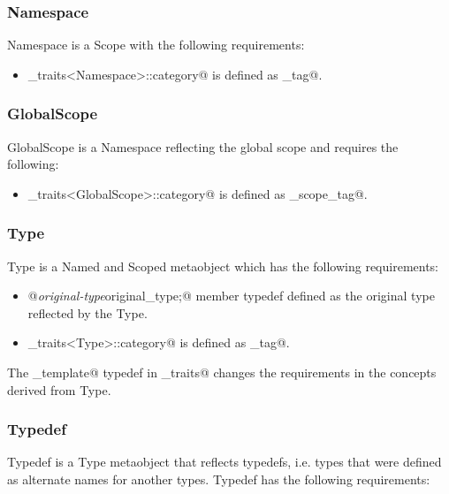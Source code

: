\subsubsection{Namespace}

{\metaobject Namespace} is a {\metaobject Scope} with the following requirements:

\begin{itemize}
	\item \verb@metaobject_traits<Namespace>::category@ is defined as
	\verb@namespace_tag@.
\end{itemize}

\subsubsection{GlobalScope}

{\metaobject GlobalScope} is a {\metaobject Namespace} reflecting the global scope
and requires the following:

\begin{itemize}
	\item \verb@metaobject_traits<GlobalScope>::category@ is defined as
	\verb@global_scope_tag@.
\end{itemize}

\subsubsection{Type}

{\metaobject Type} is a {\metaobject Named} and {\metaobject Scoped} metaobject which
has the following requirements:

\begin{itemize}
	\item{\verb@typedef @{\em original-type}\verb@ original_type;@} member typedef
	defined as the original type reflected by the {\metaobject Type}.

	\item \verb@metaobject_traits<Type>::category@ is defined as \verb@type_tag@.
\end{itemize}

The \verb@is_template@ typedef in \verb@metaobject_traits@ changes the requirements
in the concepts derived from {\metaobject Type}.

\subsubsection{Typedef}

{\metaobject Typedef} is a {\metaobject Type} metaobject that reflects typedefs,
i.e. types that were defined as alternate names for another types.
{\metaobject Typedef} has the following requirements:

